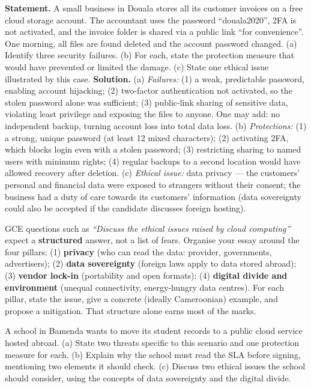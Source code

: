 \documentclass[11pt]{article}
\begin{document}
\begin{exoresolu}
\textbf{Statement.} A small business in Douala stores all its customer invoices on a free cloud storage account. The accountant uses the password ``douala2020'', 2FA is not activated, and the invoice folder is shared via a public link ``for convenience''. One morning, all files are found deleted and the account password changed. (a) Identify three security failures. (b) For each, state the protection measure that would have prevented or limited the damage. (c) State one ethical issue illustrated by this case.
\tcblower
\textbf{Solution.}
(a) \emph{Failures:} (1) a weak, predictable password, enabling account hijacking; (2) two-factor authentication not activated, so the stolen password alone was sufficient; (3) public-link sharing of sensitive data, violating least privilege and exposing the files to anyone. One may add: no independent backup, turning account loss into total data loss.
(b) \emph{Protections:} (1) a strong, unique password (at least 12 mixed characters); (2) activating 2FA, which blocks login even with a stolen password; (3) restricting sharing to named users with minimum rights; (4) regular backups to a second location would have allowed recovery after deletion.
(c) \emph{Ethical issue:} data privacy — the customers' personal and financial data were exposed to strangers without their consent; the business had a duty of care towards its customers' information (data sovereignty could also be accepted if the candidate discusses foreign hosting).
\end{exoresolu}

\begin{attention}
GCE questions such as \emph{``Discuss the ethical issues raised by cloud computing''} expect a \textbf{structured} answer, not a list of fears. Organise your essay around the four pillars: (1) \textbf{privacy} (who can read the data: provider, governments, advertisers); (2) \textbf{data sovereignty} (foreign laws apply to data stored abroad); (3) \textbf{vendor lock-in} (portability and open formats); (4) \textbf{digital divide and environment} (unequal connectivity, energy-hungry data centres). For each pillar, state the issue, give a concrete (ideally Cameroonian) example, and propose a mitigation. That structure alone earns most of the marks.
\end{attention}

\begin{exercice}
A school in Bamenda wants to move its student records to a public cloud service hosted abroad. (a) State two threats specific to this scenario and one protection measure for each. (b) Explain why the school must read the SLA before signing, mentioning two elements it should check. (c) Discuss two ethical issues the school should consider, using the concepts of data sovereignty and the digital divide.
\end{exercice}
\end{document}
